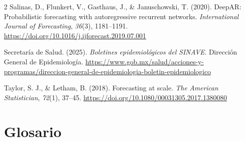 \documentclass[12pt, letterpaper]{article}
\begin{document}
\begin{multicols}{2}
Salinas, D., Flunkert, V., Gasthaus, J., \& Januschowski, T. (2020). DeepAR: Probabilistic forecasting with autoregressive recurrent networks. \textit{International Journal of Forecasting}, \textit{36}(3), 1181--1191. \url{https://doi.org/10.1016/j.ijforecast.2019.07.001}

Secretaría de Salud. (2025). \textit{Boletines epidemiológicos del SINAVE}. Dirección General de Epidemiología. \url{https://www.gob.mx/salud/acciones-y-programas/direccion-general-de-epidemiologia-boletin-epidemiologico}

Taylor, S. J., \& Letham, B. (2018). Forecasting at scale. \textit{The American Statistician}, \textit{72}(1), 37--45. \url{https://doi.org/10.1080/00031305.2017.1380080}

\end{multicols}

\newpage
\section{Glosario}\label{sec:glosario}
\end{document}
